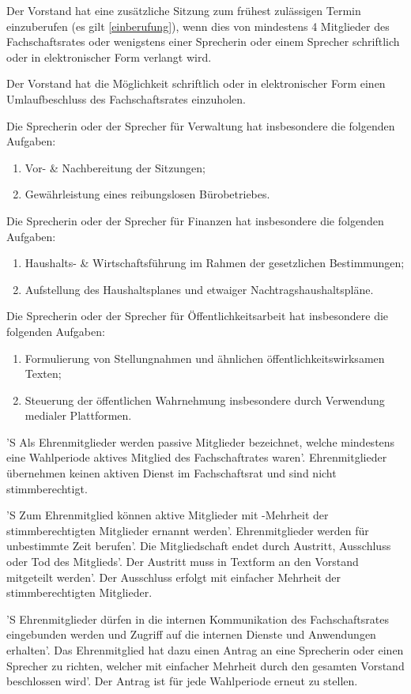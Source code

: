\documentclass[%
	parskip=half,
]{scrartcl}
\begin{document}
\begin{contract}
Der Vorstand hat eine zusätzliche Sitzung zum frühest zulässigen Termin einzuberufen (es gilt \ref{einberufung}), wenn
dies von mindestens 4 Mitglieder des Fachschaftsrates oder wenigstens einer Sprecherin oder einem Sprecher schriftlich
oder in elektronischer Form verlangt wird.

Der Vorstand hat die Möglichkeit schriftlich oder in elektronischer Form einen Umlaufbeschluss des Fachschaftsrates
einzuholen.

Die Sprecherin oder der Sprecher für Verwaltung hat insbesondere die folgenden Aufgaben:
\begin{enumerate}[\qquad a)]
	\item Vor- \& Nachbereitung der Sitzungen;
	\item Gewährleistung eines reibungslosen Bürobetriebes.
\end{enumerate}

Die Sprecherin oder der Sprecher für Finanzen hat insbesondere die folgenden Aufgaben:
\begin{enumerate}[\qquad a)]
	\item Haushalts- \& Wirtschaftsführung im Rahmen der gesetzlichen Bestimmungen;
	\item Aufstellung des Haushaltsplanes und etwaiger Nachtragshaushaltspläne.
\end{enumerate}

Die Sprecherin oder der Sprecher für Öffentlichkeitsarbeit hat insbesondere die folgenden Aufgaben:
\begin{enumerate}[\qquad a)]
	\item Formulierung von Stellungnahmen und ähnlichen öffentlichkeitswirksamen Texten;
	\item Steuerung der öffentlichen Wahrnehmung insbesondere durch Verwendung medialer Plattformen.
\end{enumerate}


'S Als Ehrenmitglieder werden passive Mitglieder bezeichnet, welche mindestens eine Wahlperiode aktives Mitglied des
Fachschaftrates waren'. Ehrenmitglieder übernehmen keinen aktiven Dienst im Fachschaftsrat und sind nicht
stimmberechtigt.

'S Zum Ehrenmitglied können aktive Mitglieder mit -Mehrheit der stimmberechtigten Mitglieder ernannt
werden'. Ehrenmitglieder werden für unbestimmte Zeit berufen'. Die Mitgliedschaft endet durch Austritt, Ausschluss oder
Tod des Mitglieds'. Der Austritt muss in Textform an den Vorstand mitgeteilt werden'. Der Ausschluss erfolgt mit
einfacher Mehrheit der stimmberechtigten Mitglieder.

'S Ehrenmitglieder dürfen in die internen Kommunikation des Fachschaftsrates eingebunden werden und Zugriff auf die
internen Dienste und Anwendungen erhalten'. Das Ehrenmitglied hat dazu einen Antrag an eine Sprecherin oder einen
Sprecher zu richten, welcher mit einfacher Mehrheit durch den gesamten Vorstand beschlossen wird'. Der Antrag ist für
jede Wahlperiode erneut zu stellen.

\end{contract}
\end{document}
